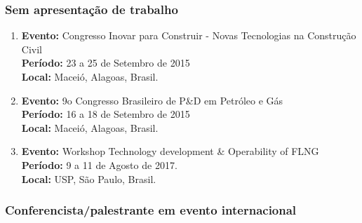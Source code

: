 \documentclass[a4paper,oneside,10pt]{article}
\begin{document}

\subsubsection{Sem apresentação de trabalho}
\vspace{0.3cm}

\begin{enumerate}
\renewcommand{\labelenumi}{{\large\bfseries\arabic{enumi}.}}

\item   \textbf{Evento:} Congresso Inovar para Construir - Novas Tecnologias na Construção Civil 
 \mbox{} \\
        \textbf{Período:} 23 a 25 de Setembro de 2015\\
        \textbf{Local:} Maceió, Alagoas, Brasil.
        
\item   \textbf{Evento:} 9o Congresso Brasileiro de P\&D em Petróleo e Gás
 \mbox{} \\
        \textbf{Período:} 16 a 18 de Setembro de 2015\\
        \textbf{Local:} Maceió, Alagoas, Brasil.
        
 \item   \textbf{Evento:} Workshop Technology development \& Operability of FLNG
 \mbox{} \\
        \textbf{Período:} 9 a 11 de Agosto de 2017.\\
        \textbf{Local:}  USP, São Paulo, Brasil.

\end{enumerate}

\subsubsection{Conferencista/palestrante em evento internacional}
\vspace{0.3cm}
\end{document}
